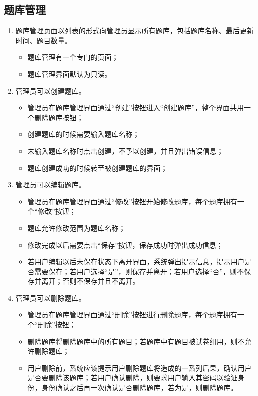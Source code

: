 \documentclass{article}
\begin{document}
    \subsection{题库管理}
    \begin{enumerate}
        \item 题库管理页面以列表的形式向管理员显示所有题库，包括题库名称、最后更新时间、题目数量。
        \begin{itemize}
            \item 题库管理有一个专门的页面；
            \item 题库管理界面默认为只读。
        \end{itemize}

        \item 管理员可以创建题库。
        \begin{itemize}
            \item 管理员在题库管理界面通过“创建”按钮进入“创建题库”，整个界面共用一个删除题库按钮；
            \item 创建题库的时候需要输入题库名称；
            \item 未输入题库名称时点击创建，不予以创建，并且弹出错误信息；
            \item 题库创建成功的时候转至被创建题库的界面；
        \end{itemize}

        \item 管理员可以编辑题库。
        \begin{itemize}
            \item 管理员在题库管理界面通过“修改”按钮开始修改题库，每个题库拥有一个“修改”按钮；
            \item 题库允许修改范围为题库名称；
            \item 修改完成以后需要点击“保存”按钮，保存成功时弹出成功信息；
            \item 若用户编辑以后未保存状态下离开界面，系统弹出提示信息，提示用户是否需要保存；若用户选择“是”，则保存并离开；若用户选择“否”，则不保存并离开；否则不保存并且不离开。
        \end{itemize}

        \item 管理员可以删除题库。
        \begin{itemize}
            \item 管理员在题库管理界面通过“删除”按钮进行删除题库，每个题库拥有一个“删除”按钮；
            \item 删除题库将删除题库中的所有题目；若题库中有题目被试卷组用，则不允许删除题库；
            \item 用户删除前，系统应该提示用户删除题库将造成的一系列后果，确认用户是否要删除该题库；若用户确认删除，则要求用户输入其密码以验证身份，身份确认之后再一次确认是否删除题库，若为是，则删除题库。
        \end{itemize}

    \end{enumerate}
\end{document}
